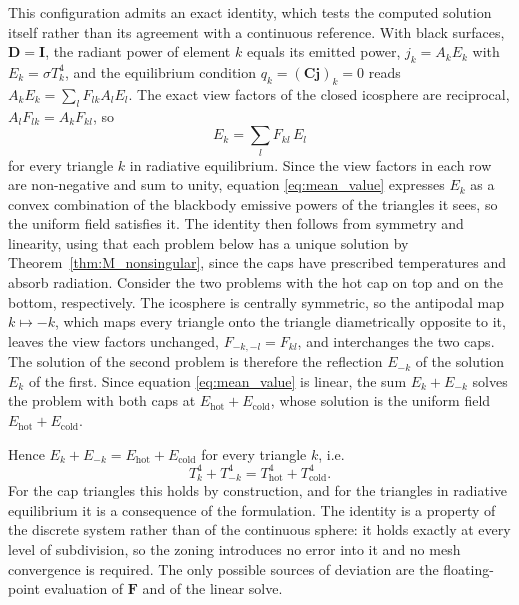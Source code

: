\documentclass[preprint,1p,times]{elsarticle}
\theoremstyle{plain}
\theoremstyle{definition}
\theoremstyle{remark}
\begin{document}
This configuration admits an exact identity, which tests the computed solution itself rather than its agreement with a continuous reference. With black surfaces, $\mathbf{D} = \mathbf{I}$, the radiant power of element $k$ equals its emitted power, $j_k = A_k E_k$ with $E_k = \sigma T_k^4$, and the equilibrium condition $q_k = (\mathbf{C}\mathbf{j})_k = 0$ reads $A_k E_k = \sum_l F_{lk} A_l E_l$. The exact view factors of the closed icosphere are reciprocal, $A_l F_{lk} = A_k F_{kl}$, so
\begin{equation}
E_k = \sum_l F_{kl}\, E_l
\label{eq:mean_value}
\end{equation}
for every triangle $k$ in radiative equilibrium. Since the view factors in each row are non-negative and sum to unity, equation \eqref{eq:mean_value} expresses $E_k$ as a convex combination of the blackbody emissive powers of the triangles it sees, so the uniform field satisfies it. The identity then follows from symmetry and linearity, using that each problem below has a unique solution by Theorem~\ref{thm:M_nonsingular}, since the caps have prescribed temperatures and absorb radiation. Consider the two problems with the hot cap on top and on the bottom, respectively. The icosphere is centrally symmetric, so the antipodal map $k \mapsto -k$, which maps every triangle onto the triangle diametrically opposite to it, leaves the view factors unchanged, $F_{-k,-l} = F_{kl}$, and interchanges the two caps. The solution of the second problem is therefore the reflection $E_{-k}$ of the solution $E_k$ of the first. Since equation \eqref{eq:mean_value} is linear, the sum $E_k + E_{-k}$ solves the problem with both caps at $E_\mathrm{hot} + E_\mathrm{cold}$, whose solution is the uniform field $E_\mathrm{hot} + E_\mathrm{cold}$.

Hence $E_k + E_{-k} = E_\mathrm{hot} + E_\mathrm{cold}$ for every triangle $k$, i.e.
\begin{equation}
T_k^4 + T_{-k}^4 = T_\mathrm{hot}^4 + T_\mathrm{cold}^4 .
\label{eq:antipodal_identity}
\end{equation}
For the cap triangles this holds by construction, and for the triangles in radiative equilibrium it is a consequence of the formulation. The identity is a property of the discrete system rather than of the continuous sphere: it holds exactly at every level of subdivision, so the zoning introduces no error into it and no mesh convergence is required. The only possible sources of deviation are the floating-point evaluation of $\mathbf{F}$ and of the linear solve.
\end{document}

